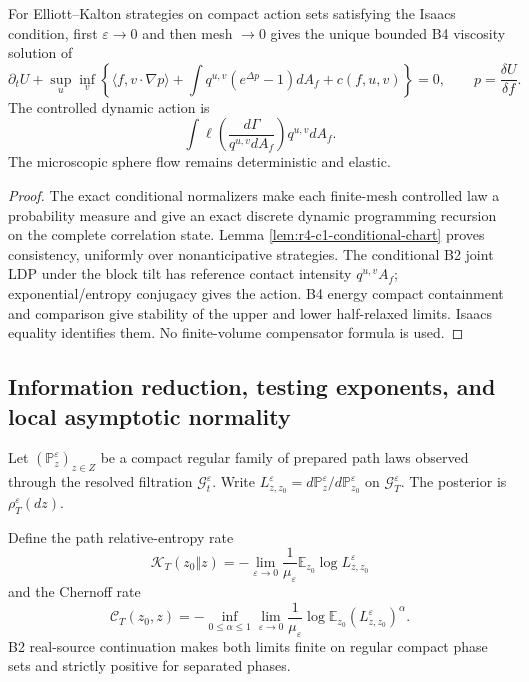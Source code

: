 \begin{theorem}
\label{thm:r3-c1-adaptive}
For Elliott--Kalton strategies on compact action sets satisfying the Isaacs
condition, first \(\varepsilon\to0\) and then mesh \(\to0\) gives the unique
bounded B4 viscosity solution of
\[
 \partial_tU+\sup_u\inf_v
 \left\{
 \langle f,v\cdot\nabla p\rangle
 +\int q^{u,v}(e^{\Delta p}-1)dA_f+c(f,u,v)
 \right\}=0,
 \qquad p=\frac{\delta U}{\delta f}.
\]
The controlled dynamic action is
\[
 \int\ell\left(
 \frac{d\Gamma}{q^{u,v}dA_f}
 \right)q^{u,v}dA_f.
\]
The microscopic sphere flow remains deterministic and elastic.
\end{theorem}

\begin{proof}
The exact conditional normalizers make each finite-mesh controlled law a
probability measure and give an exact discrete dynamic programming recursion
on the complete correlation state.  Lemma
\ref{lem:r4-c1-conditional-chart} proves consistency, uniformly over
nonanticipative strategies.  The conditional B2 joint LDP under the block tilt
has reference contact intensity \(q^{u,v}A_f\); exponential/entropy conjugacy
gives the action.  B4 energy compact containment and comparison give stability
of the upper and lower half-relaxed limits.  Isaacs equality identifies them.
No finite-volume compensator formula is used.
\end{proof}

\subsection{Information reduction, testing exponents, and local asymptotic normality}

Let \((\mathbb P_z^\varepsilon)_{z\in Z}\) be a compact regular family of
prepared path laws observed through the resolved filtration
\(\mathcal G_t^\varepsilon\).  Write
\(L_{z,z_0}^\varepsilon=d\mathbb P_z^\varepsilon/
 d\mathbb P_{z_0}^\varepsilon\) on \(\mathcal G_T^\varepsilon\).  The
posterior is \(\rho_T^\varepsilon(dz)\).

Define the path relative-entropy rate
\[
 \mathcal K_T(z_0\Vert z)
 =-\lim_{\varepsilon\to0}
 \frac1{\mu_\varepsilon}
 \mathbb E_{z_0}\log L_{z,z_0}^\varepsilon
\]
and the Chernoff rate
\[
 \mathcal C_T(z_0,z)
 =-\inf_{0\le\alpha\le1}
 \lim_{\varepsilon\to0}
 \frac1{\mu_\varepsilon}
 \log\mathbb E_{z_0}
 (L_{z,z_0}^\varepsilon)^\alpha.
\]
B2 real-source continuation makes both limits finite on regular compact phase
sets and strictly positive for separated phases.

